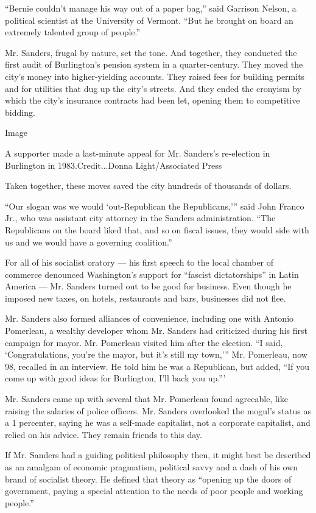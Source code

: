 ``Bernie couldn't manage his way out of a paper bag,'' said Garrison
Nelson, a political scientist at the University of Vermont. ``But he
brought on board an extremely talented group of people.''

Mr. Sanders, frugal by nature, set the tone. And together, they
conducted the first audit of Burlington's pension system in a
quarter-century. They moved the city's money into higher-yielding
accounts. They raised fees for building permits and for utilities that
dug up the city's streets. And they ended the cronyism by which the
city's insurance contracts had been let, opening them to competitive
bidding.

Image

A supporter made a last-minute appeal for Mr. Sanders's re-election in
Burlington in 1983.Credit...Donna Light/Associated Press

Taken together, these moves saved the city hundreds of thousands of
dollars.

``Our slogan was we would `out-Republican the Republicans,''' said John
Franco Jr., who was assistant city attorney in the Sanders
administration. ``The Republicans on the board liked that, and so on
fiscal issues, they would side with us and we would have a governing
coalition.''

For all of his socialist oratory --- his first speech to the local
chamber of commerce denounced Washington's support for ``fascist
dictatorships'' in Latin America --- Mr. Sanders turned out to be good
for business. Even though he imposed new taxes, on hotels, restaurants
and bars, businesses did not flee.

Mr. Sanders also formed alliances of convenience, including one with
Antonio Pomerleau, a wealthy developer whom Mr. Sanders had criticized
during his first campaign for mayor. Mr. Pomerleau visited him after the
election. ``I said, `Congratulations, you're the mayor, but it's still
my town,''' Mr. Pomerleau, now 98, recalled in an interview. He told him
he was a Republican, but added, ``If you come up with good ideas for
Burlington, I'll back you up.'''

Mr. Sanders came up with several that Mr. Pomerleau found agreeable,
like raising the salaries of police officers. Mr. Sanders overlooked the
mogul's status as a 1 percenter, saying he was a self-made capitalist,
not a corporate capitalist, and relied on his advice. They remain
friends to this day.

If Mr. Sanders had a guiding political philosophy then, it might best be
described as an amalgam of economic pragmatism, political savvy and a
dash of his own brand of socialist theory. He defined that theory as
``opening up the doors of government, paying a special attention to the
needs of poor people and working people.''

